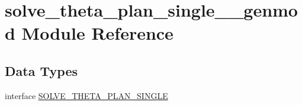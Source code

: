\hypertarget{namespacesolve__theta__plan__single____genmod}{}\section{solve\+\_\+theta\+\_\+plan\+\_\+single\+\_\+\+\_\+genmod Module Reference}
\label{namespacesolve__theta__plan__single____genmod}
\subsection*{Data Types}
\begin{DoxyCompactItemize}
\item 
interface \mbox{\hyperlink{interfacesolve__theta__plan__single____genmod_1_1_s_o_l_v_e___t_h_e_t_a___p_l_a_n___s_i_n_g_l_e}{S\+O\+L\+V\+E\+\_\+\+T\+H\+E\+T\+A\+\_\+\+P\+L\+A\+N\+\_\+\+S\+I\+N\+G\+LE}}
\end{DoxyCompactItemize}
